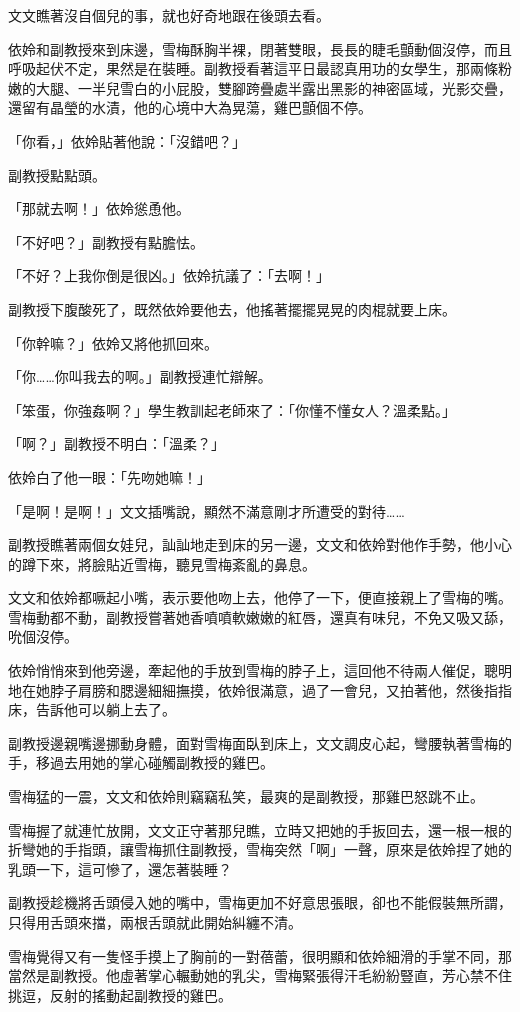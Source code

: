 文文瞧著沒自個兒的事，就也好奇地跟在後頭去看。

依姈和副教授來到床邊，雪梅酥胸半裸，閉著雙眼，長長的睫毛顫動個沒停，而且呼吸起伏不定，果然是在裝睡。副教授看著這平日最認真用功的女學生，那兩條粉嫩的大腿、一半兒雪白的小屁股，雙腳跨疊處半露出黑影的神密區域，光影交疊，還留有晶瑩的水漬，他的心境中大為晃蕩，雞巴顫個不停。

「你看，」依姈貼著他說：「沒錯吧？」

副教授點點頭。

「那就去啊！」依姈慫恿他。

「不好吧？」副教授有點膽怯。

「不好？上我你倒是很凶。」依姈抗議了：「去啊！」

副教授下腹酸死了，既然依姈要他去，他搖著擺擺晃晃的肉棍就要上床。

「你幹嘛？」依姈又將他抓回來。

「你……你叫我去的啊。」副教授連忙辯解。

「笨蛋，你強姦啊？」學生教訓起老師來了：「你懂不懂女人？溫柔點。」

「啊？」副教授不明白：「溫柔？」

依姈白了他一眼：「先吻她嘛！」

「是啊！是啊！」文文插嘴說，顯然不滿意剛才所遭受的對待……

副教授瞧著兩個女娃兒，訕訕地走到床的另一邊，文文和依姈對他作手勢，他小心的蹲下來，將臉貼近雪梅，聽見雪梅紊亂的鼻息。

文文和依姈都噘起小嘴，表示要他吻上去，他停了一下，便直接親上了雪梅的嘴。雪梅動都不動，副教授嘗著她香噴噴軟嫩嫩的紅唇，還真有味兒，不免又吸又舔，吮個沒停。

依姈悄悄來到他旁邊，牽起他的手放到雪梅的脖子上，這回他不待兩人催促，聰明地在她脖子肩膀和腮邊細細撫摸，依姈很滿意，過了一會兒，又拍著他，然後指指床，告訴他可以躺上去了。

副教授邊親嘴邊挪動身體，面對雪梅面臥到床上，文文調皮心起，彎腰執著雪梅的手，移過去用她的掌心碰觸副教授的雞巴。

雪梅猛的一震，文文和依姈則竊竊私笑，最爽的是副教授，那雞巴怒跳不止。

雪梅握了就連忙放開，文文正守著那兒瞧，立時又把她的手扳回去，還一根一根的折彎她的手指頭，讓雪梅抓住副教授，雪梅突然「啊」一聲，原來是依姈捏了她的乳頭一下，這可慘了，還怎著裝睡？

副教授趁機將舌頭侵入她的嘴中，雪梅更加不好意思張眼，卻也不能假裝無所謂，只得用舌頭來擋，兩根舌頭就此開始糾纏不清。

雪梅覺得又有一隻怪手摸上了胸前的一對蓓蕾，很明顯和依姈細滑的手掌不同，那當然是副教授。他虛著掌心輾動她的乳尖，雪梅緊張得汗毛紛紛豎直，芳心禁不住挑逗，反射的搖動起副教授的雞巴。

